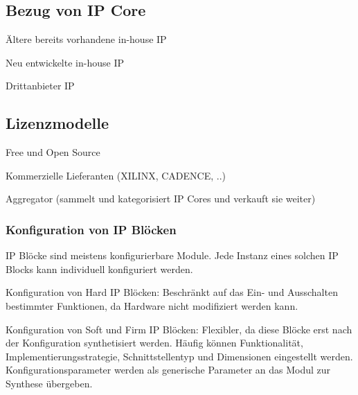 \begin{multicols}{2}
\subsection{Bezug von IP Core}
\begin{compactitem}
    \item Ältere bereits vorhandene in-house IP
    \item Neu entwickelte in-house IP
    \item Drittanbieter IP
\end{compactitem}

\vfill\null
\columnbreak

\subsection{Lizenzmodelle}
\begin{compactitem}
    \item Free und Open Source
    \item Kommerzielle Lieferanten (XILINX, CADENCE, ..)
    \item Aggregator (sammelt und kategorisiert IP Cores und verkauft sie weiter)
\end{compactitem}
\end{multicols}

\subsubsection{Konfiguration von IP Blöcken}
\begin{compactitem}
    \item IP Blöcke sind meistens konfigurierbare Module. Jede Instanz eines solchen IP Blocks kann individuell konfiguriert werden.
    \item Konfiguration von Hard IP Blöcken: Beschränkt auf das Ein- und Ausschalten bestimmter Funktionen, da Hardware nicht modifiziert werden kann.
    \item Konfiguration von Soft und Firm IP Blöcken: Flexibler, da diese Blöcke erst nach der Konfiguration synthetisiert werden. Häufig können Funktionalität, Implementierungsstrategie, Schnittstellentyp und Dimensionen eingestellt werden. Konfigurationsparameter werden als generische Parameter an das Modul zur Synthese übergeben.
\end{compactitem}

